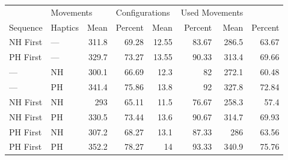 \begin{tabular}{llrrrrrr}
\toprule
          & \multicolumn{2}{l}{Movements} & \multicolumn{2}{l}{Configurations} & \multicolumn{2}{l}{Used Movements} \\
 Sequence & Haptics &      Mean & Percent &           Mean & Percent &           Mean & Percent \\
\midrule
 NH First &  --- & 311.8 & 69.28 & 12.55 & 83.67 & 286.5 & 63.67 \\
 PH First &  --- & 329.7 & 73.27 & 13.55 & 90.33 & 313.4 & 69.66 \\
 --- &  NH & 300.1 & 66.69 & 12.3 & 82 & 272.1 & 60.48 \\
 --- &  PH & 341.4 & 75.86 & 13.8 & 92 & 327.8 & 72.84 \\
 NH First &  NH & 293 & 65.11 & 11.5 & 76.67 & 258.3 & 57.4 \\
 NH First &  PH & 330.5 & 73.44 & 13.6 & 90.67 & 314.7 & 69.93 \\
 PH First &  NH & 307.2 & 68.27 & 13.1 & 87.33 & 286 & 63.56 \\
 PH First &  PH & 352.2 & 78.27 & 14 & 93.33 & 340.9 & 75.76 \\
\bottomrule
\end{tabular}
